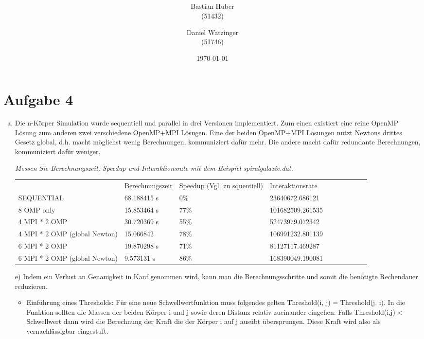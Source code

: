 \documentclass{article}
\author{Bastian Huber\\(51432) \and Daniel Watzinger\\(51746)}
\title{\textbf{\huge{\thetitle}}\\\Large\textsc{}\\\large\textsc{}}
\date{\today}
\begin{document}
\hyphenation{}

\maketitle

\pagestyle{fancy}

\section*{Aufgabe 4}
\begin{enumerate}[a)]
	\item
	Die n-Körper Simulation wurde sequentiell und parallel in drei Versionen implementiert. Zum einen existiert eine reine OpenMP Lösung zum anderen zwei verschiedene OpenMP+MPI Lösugen. Eine der beiden OpenMP+MPI Lösungen nutzt Newtons drittes Gesetz global, d.h. macht möglichst wenig Berechnungen, kommuniziert dafür mehr. Die andere macht dafür redundante Berechnungen, kommuniziert dafür weniger.
	
	\textit{Messen Sie Berechnungszeit, Speedup und Interaktionsrate mit dem Beispiel spiralgalaxie.dat.}
	\begin{center}
		\begin{tabular}{llllllllll}
			 	        	& Berechnungszeit & Speedup (Vgl. zu squentiell) & Interaktionsrate \\
			 SEQUENTIAL 	& 68.188415 s		  & 0\%		& 23640672.686121  \\
			 8 OMP only 		& 15.853464 s		  & 77\%		& 101682509.261535 \\
			 4 MPI * 2 OMP	& 30.720369 s		  &	55\%		& 52473979.072342	\\
			 4 MPI * 2 OMP (global Newton)	& 15.066842		  &	78\%		& 106991232.801139	\\
			 6 MPI * 2 OMP	& 19.870298	s	  &	71\%		& 81127117.469287	\\
			 6 MPI * 2 OMP (global Newton)	& 9.573131 s		  &	86\%		& 168390049.190081	\\		 
		\end{tabular}
		\label{tab:}
	\end{center}
	
	\item[e)]
	Indem ein Verlust an Genauigkeit in Kauf genommen wird, kann man die Berechnungsschritte
	und somit die benötigte Rechendauer reduzieren.
	\begin{itemize}
		\item Einführung eines Thresholds: Für eine neue Schwellwertfunktion muss folgendes
	gelten Threshold(i, j) =  Threshold(j, i). In die Funktion sollten die Massen der beiden
	Körper i und j sowie deren Distanz relativ zueinander eingehen.
	Falls Threshold(i,j) < Schwellwert dann wird die Berechnung der Kraft die der Körper
	i auf j ausübt übersprungen. Diese Kraft
	wird also als vernachlässigbar eingestuft.
	

\end{itemize}
\end{enumerate}
\end{document}
